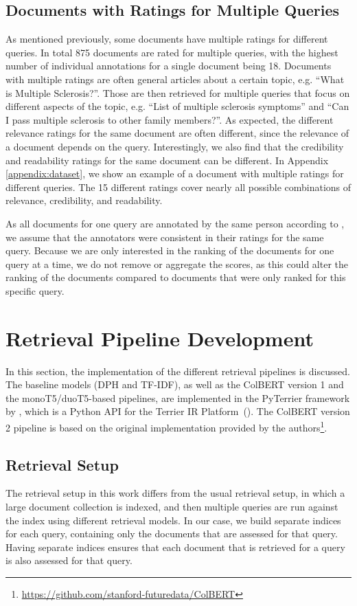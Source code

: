 \subsection{Documents with Ratings for Multiple Queries}\label{sec:documents-with-multiple-ratings}
As mentioned previously, some documents have multiple ratings for different queries.
In total 875 documents are rated for multiple queries, with the highest number of individual annotations for a single document being 18.
Documents with multiple ratings are often general articles about a certain topic, e.g. ``What is Multiple Sclerosis?''.
Those are then retrieved for multiple queries that focus on different aspects of the topic, e.g. ``List of multiple sclerosis symptoms'' and ``Can I pass multiple sclerosis to other family members?''.
As expected, the different relevance ratings for the same document are often different, since the relevance of a document depends on the query.
Interestingly, we also find that the credibility and readability ratings for the same document can be different.
In Appendix \ref{appendix:dataset}, we show an example of a document with multiple ratings for different queries.
The 15 different ratings cover nearly all possible combinations of relevance, credibility, and readability.

As all documents for one query are annotated by the same person according to \cite{goeuriot:2021:Consumer}, we assume that the annotators were consistent in their ratings for the same query.
Because we are only interested in the ranking of the documents for one query at a time, we do not remove or aggregate the scores, as this could alter the ranking of the documents compared to documents that were only ranked for this specific query.

\section{Retrieval Pipeline Development}
In this section, the implementation of the different retrieval pipelines is discussed.
The baseline models (DPH and TF-IDF), as well as the ColBERT version 1 and the monoT5/duoT5-based pipelines, are implemented in the PyTerrier framework by \cite{pyterrier:2020:Declarative}, which is a Python API for the Terrier IR Platform~(\cite{macdonald:2012:From}).
The ColBERT version 2 pipeline is based on the original implementation provided by the authors\footnote{\url{https://github.com/stanford-futuredata/ColBERT}}.

\subsection{Retrieval Setup}
The retrieval setup in this work differs from the usual retrieval setup, in which a large document collection is indexed, and then multiple queries are run against the index using different retrieval models.
In our case, we build separate indices for each query, containing only the documents that are assessed for that query.
Having separate indices ensures that each document that is retrieved for a query is also assessed for that query.


